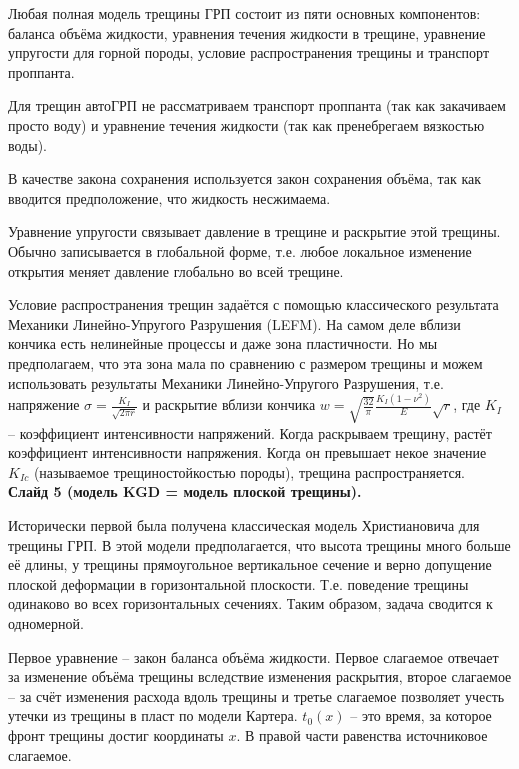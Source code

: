 \documentclass[a4paper, 12pt]{article}
\begin{document}
Любая полная модель трещины ГРП состоит из пяти основных компонентов: баланса объёма жидкости, уравнения течения жидкости в трещине, уравнение упругости для горной породы, условие распространения трещины и транспорт проппанта.

Для трещин автоГРП не рассматриваем транспорт проппанта (так как закачиваем просто воду) и уравнение течения жидкости (так как пренебрегаем вязкостью воды).

В качестве закона сохранения используется закон сохранения объёма, так как вводится предположение, что жидкость несжимаема.

Уравнение упругости связывает давление в трещине и раскрытие этой трещины.
Обычно записывается в глобальной форме, т.е. любое локальное изменение открытия меняет давление глобально во всей трещине.

Условие распространения трещин задаётся с помощью классического результата Механики Линейно-Упругого Разрушения (LEFM).
На самом деле вблизи кончика есть нелинейные процессы и даже зона пластичности.
Но мы предполагаем, что эта зона мала по сравнению с размером трещины и можем использовать результаты Механики Линейно-Упругого Разрушения, т.е. напряжение $\sigma=\frac{K_I}{\sqrt{2\pi r}}$ и раскрытие вблизи кончика $w=\sqrt{\frac{32}{\pi}}\frac{K_{I}\left(1-\nu^2\right)}{E}\sqrt{r}$, где $K_I$ -- коэффициент интенсивности напряжений.
Когда раскрываем трещину, растёт коэффициент интенсивности напряжения.
Когда он превышает некое значение $K_{Ic}$ (называемое трещиностойкостью породы), трещина распространяется.\\

\textbf{Слайд 5 (модель KGD = модель плоской трещины).}

Исторически первой была получена классическая модель Христиановича для трещины ГРП.
В этой модели предполагается, что высота трещины много больше её длины, у трещины прямоугольное вертикальное сечение и верно допущение плоской деформации в горизонтальной плоскости.
Т.е. поведение трещины одинаково во всех горизонтальных сечениях.
Таким образом, задача сводится к одномерной.

Первое уравнение -- закон баланса объёма жидкости.
Первое слагаемое отвечает за изменение объёма трещины вследствие изменения раскрытия, второе слагаемое -- за счёт изменения расхода вдоль трещины и третье слагаемое позволяет учесть утечки из трещины в пласт по модели Картера.
$t_0(x)$ -- это время, за которое фронт трещины достиг координаты $x$.
В правой части равенства источниковое слагаемое.
\end{document}
